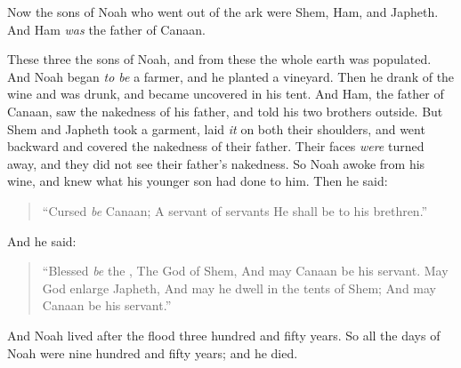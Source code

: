 
\bverse Now the sons of Noah who went out of the ark were Shem, Ham, and Japheth. And Ham \textit{was} the father of Canaan.

\bverse These three  the sons of Noah, and from these the whole earth was populated.
\bverse And Noah began \textit{to be} a farmer, and he planted a vineyard.
\bverse Then he drank of the wine and was drunk, and became uncovered in his tent.
\bverse And Ham, the father of Canaan, saw the nakedness of his father, and told his two brothers outside.
\bverse But Shem and Japheth took a garment, laid \textit{it} on both their shoulders, and went backward and covered the nakedness of their father. Their faces \textit{were} turned away, and they did not see their father's nakedness.
\bverse So Noah awoke from his wine, and knew what his younger son had done to him.
\bverse Then he said:
\begin{quotation}
``Cursed \textit{be} Canaan; A servant of servants He shall be to his brethren.''
\end{quotation}
\bverse And he said:
\begin{quotation}
``Blessed \textit{be} the \lord, The God of Shem, And may Canaan be his servant.
\bverse May God enlarge Japheth, And may he dwell in the tents of Shem; And may Canaan be his servant.''
\end{quotation}

\bverse And Noah lived after the flood three hundred and fifty years.
\bverse So all the days of Noah were nine hundred and fifty years; and he died.
